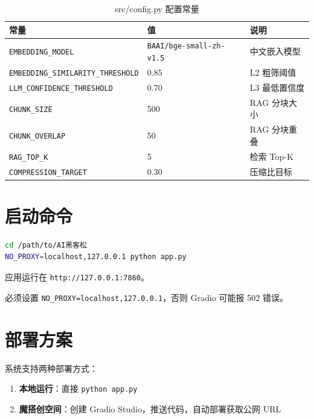 \documentclass[12pt,a4paper]{article}
\begin{document}
\begin{table}[H]
\centering
\caption{src/config.py 配置常量}
\begin{tabular}{llp{5cm}}
\toprule
\textbf{常量} & \textbf{值} & \textbf{说明} \\
\midrule
\texttt{EMBEDDING\_MODEL} & \texttt{BAAI/bge-small-zh-v1.5} & 中文嵌入模型 \\
\texttt{EMBEDDING\_SIMILARITY\_THRESHOLD} & 0.85 & L2 粗筛阈值 \\
\texttt{LLM\_CONFIDENCE\_THRESHOLD} & 0.70 & L3 最低置信度 \\
\texttt{CHUNK\_SIZE} & 500 & RAG 分块大小 \\
\texttt{CHUNK\_OVERLAP} & 50 & RAG 分块重叠 \\
\texttt{RAG\_TOP\_K} & 5 & 检索 Top-K \\
\texttt{COMPRESSION\_TARGET} & 0.30 & 压缩比目标 \\
\bottomrule
\end{tabular}
\end{table}

\section{启动命令}

\begin{lstlisting}[language=bash, title={启动应用}]
cd /path/to/AI黑客松
NO_PROXY=localhost,127.0.0.1 python app.py
\end{lstlisting}

应用运行在 \texttt{http://127.0.0.1:7860}。

\begin{warnbox}[注意]
必须设置 \texttt{NO\_PROXY=localhost,127.0.0.1}，否则 Gradio 可能报 502 错误。
\end{warnbox}

\section{部署方案}

系统支持两种部署方式：

\begin{enumerate}[leftmargin=2em]
    \item \textbf{本地运行}：直接 \texttt{python app.py}
    \item \textbf{魔搭创空间}：创建 Gradio Studio，推送代码，自动部署获取公网 URL
\end{enumerate}


\newpage
\end{document}
